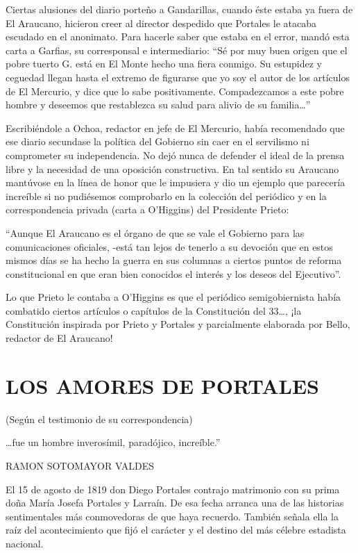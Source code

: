 \documentclass[10pt,twoside,openright]{memoir}
\begin{document}
Ciertas alusiones del diario porteño a Gandarillas, cuando éste estaba
ya fuera de El Araucano, hicieron creer al director despedido que
Portales le atacaba escudado en el anonimato. Para hacerle saber que
estaba en el error, mandó esta carta a Garfias, su corresponsal e
intermediario: ``Sé por muy buen origen
que el pobre tuerto G. está en El
Monte hecho una fiera conmigo. Su estupidez y ceguedad llegan hasta
el extremo de figurarse que yo soy
el autor de los artículos de El Mercurio, y dice que lo sabe
positivamente. Compadezcamos a este pobre hombre y deseemos que
restablezca su salud para alivio de su familia\ldots''

Escribiéndole a Ochoa, redactor en jefe de El Mercurio, había
recomendado que ese diario secundase la política del Gobierno sin caer
en el servilismo ni comprometer su independencia. No dejó nunca de
defender el ideal de la prensa libre y la necesidad de una oposición
constructiva. En tal sentido su Araucano mantúvose en la línea de honor
que le impusiera y dio un ejemplo que parecería increíble si no
pudiésemos comprobarlo en la colección del periódico y en la
correspondencia privada (carta a O'Higgins) del Presidente Prieto:

``Aunque El Araucano es el órgano de que se vale el Gobierno para las
comunicaciones oficiales, -está tan lejos de tenerlo a su devoción que
en estos mismos días se ha hecho la guerra en sus columnas a ciertos
puntos de reforma constitucional en que eran bien conocidos el interés y
los deseos del Ejecutivo''.

Lo que Prieto le contaba a O'Higgins es que el periódico semigobiernista
había combatido ciertos artículos o capítulos de la Constitución del
33\ldots, ¡la Constitución inspirada por Prieto y Portales y parcialmente
elaborada por Bello, redactor de El Araucano!

\chapter{LOS AMORES DE PORTALES}{(Según el testimonio de su correspondencia)}

\epigraph{\ldots{}fue un hombre inverosímil, paradójico, increíble.''}{RAMON SOTOMAYOR VALDES}

El 15 de agosto de 1819 don Diego Portales contrajo matrimonio con su
prima doña María Josefa Portales y Larraín. De esa fecha arranca una de
las historias sentimentales más
conmovedoras de que haya recuerdo. También señala ella la raíz del
acontecimiento que fijó el carácter y el destino del más célebre
estadista nacional.
\end{document}
